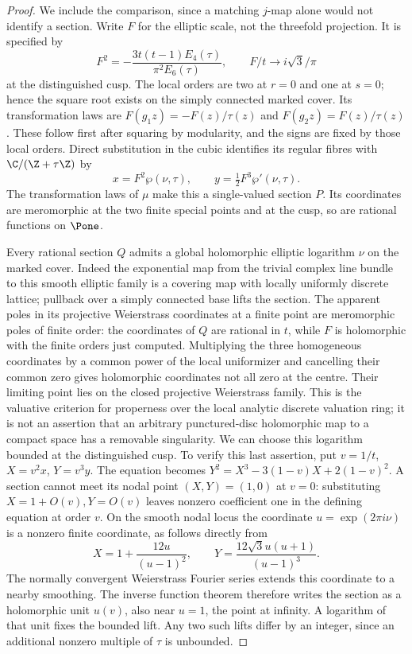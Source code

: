 \begin{proof}
We include the comparison, since a matching $j$-map alone would not
identify a section.  Write $F$ for the elliptic scale, not the
threefold projection.  It is specified by
\[
F^2=-\frac{3t(t-1)E_4(\tau)}{\pi^2E_6(\tau)},\qquad
F/t\longrightarrow i\sqrt3/\pi
\]
at the distinguished cusp.  The local orders are two at $r=0$ and
one at $s=0$; hence the square root exists on the simply connected
marked cover.  Its transformation laws are
$F(g_1z)=-F(z)/\tau(z)$ and $F(g_2z)=F(z)/\tau(z)$.
These follow first after squaring by modularity, and the signs are
fixed by those local orders.  Direct substitution in the cubic
identifies its regular fibres with $\C/(\Z+\tau\Z)$ by
\[
x=F^2\wp(\nu,\tau),\qquad y=\tfrac12F^3\wp'(\nu,\tau).
\]
The transformation laws of $\mu$ make this a single-valued section
$P$.  Its coordinates are meromorphic at the two finite special
points and at the cusp, so are rational functions on $\Pone$.

Every rational section $Q$ admits a global holomorphic elliptic
logarithm $\nu$ on the marked cover.  Indeed the exponential map
from the trivial complex line bundle to this smooth elliptic family
is a covering map with locally uniformly discrete lattice; pullback
over a simply connected base lifts the section.  The apparent poles
in its projective Weierstrass coordinates at a finite point are
meromorphic poles of finite order: the coordinates of $Q$ are
rational in $t$, while $F$ is holomorphic with the finite orders
just computed.  Multiplying the three homogeneous coordinates by
a common power of the local uniformizer and cancelling their
common zero gives holomorphic coordinates not all zero at the
centre.  Their limiting point lies on the closed projective
Weierstrass family.  This is the valuative criterion for properness
over the local analytic discrete valuation ring; it is not an
assertion that an arbitrary punctured-disc holomorphic map to a
compact space has a removable singularity.
We can choose this logarithm bounded at the distinguished cusp.
To verify this last assertion, put $v=1/t$, $X=v^2x$, $Y=v^3y$.
The equation becomes
$Y^2=X^3-3(1-v)X+2(1-v)^2$.  A section cannot meet its nodal point
$(X,Y)=(1,0)$ at $v=0$: substituting $X=1+O(v),Y=O(v)$ leaves
nonzero coefficient one in the defining equation at order $v$.
On the smooth nodal locus the coordinate
$u=\exp(2\pi i\nu)$ is a nonzero finite coordinate, as follows
directly from
\[
X=1+\frac{12u}{(u-1)^2},\qquad
Y=\frac{12\sqrt3u(u+1)}{(u-1)^3}.
\]
The normally convergent Weierstrass Fourier series extends this
coordinate to a nearby smoothing.  The inverse function theorem
therefore writes the section as a holomorphic unit $u(v)$, also
near $u=1$, the point at infinity.  A logarithm of that unit fixes
the bounded lift.  Any two such lifts differ by an integer, since
an additional nonzero multiple of $\tau$ is unbounded.


\end{proof}
